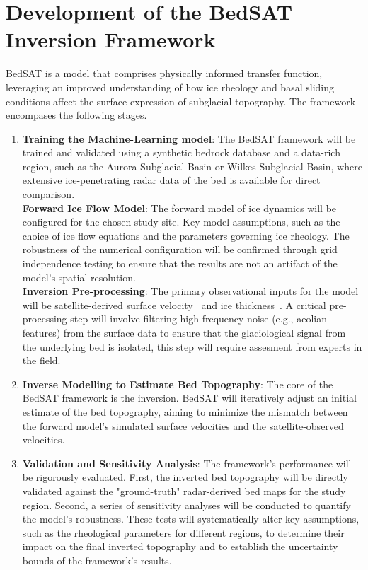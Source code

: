 \section{Development of the BedSAT Inversion Framework}
BedSAT is a model that comprises physically informed transfer function, leveraging an improved understanding of how ice rheology and basal sliding conditions affect the surface expression of subglacial topography. The framework encompases the following stages.
\begin{enumerate}
\item{\textbf{Training the Machine-Learning model}}:
The BedSAT framework will be trained and validated using a synthetic bedrock database and a data-rich region, such as the Aurora Subglacial Basin or Wilkes Subglacial Basin, where extensive ice-penetrating radar data of the bed is available for direct comparison.\\
\textbf{Forward Ice Flow Model}:
The forward model of ice dynamics will be configured for the chosen study site. Key model assumptions, such as the choice of ice flow equations and the parameters governing ice rheology. The robustness of the numerical configuration will be confirmed through grid independence testing to ensure that the results are not an artifact of the model's spatial resolution.\\
\textbf{Inversion Pre-processing}:
The primary observational inputs for the model will be satellite-derived surface velocity~\cite{itslive, REMA} and ice thickness~\cite{Young_2011, ICECAP}. A critical pre-processing step will involve filtering high-frequency noise (e.g., aeolian features) from the surface data to ensure that the glaciological signal from the underlying bed is isolated, this step will require assesment from experts in the field.
\item{\textbf{Inverse Modelling to Estimate Bed Topography}}:
The core of the BedSAT framework is the inversion. BedSAT will iteratively adjust an initial estimate of the bed topography, aiming to minimize the mismatch between the forward model's simulated surface velocities and the satellite-observed velocities.
\item{\textbf{Validation and Sensitivity Analysis}}:
The framework's performance will be rigorously evaluated. First, the inverted bed topography will be directly validated against the "ground-truth" radar-derived bed maps for the study region. Second, a series of sensitivity analyses will be conducted to quantify the model's robustness. These tests will systematically alter key assumptions, such as the rheological parameters for different regions, to determine their impact on the final inverted topography and to establish the uncertainty bounds of the framework's results.
\end{enumerate}

